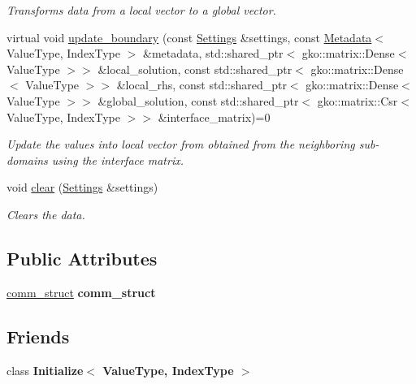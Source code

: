 \begin{DoxyCompactItemize}
\begin{DoxyCompactList}\small\item\em Transforms data from a local vector to a global vector. \end{DoxyCompactList}\item 
virtual void \hyperlink{classschwz_1_1Communicate_aa1332376dfc67f5384527be90df7cbea}{update\+\_\+boundary} (const \hyperlink{structschwz_1_1Settings}{Settings} \&settings, const \hyperlink{structschwz_1_1Metadata}{Metadata}$<$ Value\+Type, Index\+Type $>$ \&metadata, std\+::shared\+\_\+ptr$<$ gko\+::matrix\+::\+Dense$<$ Value\+Type $>$$>$ \&local\+\_\+solution, const std\+::shared\+\_\+ptr$<$ gko\+::matrix\+::\+Dense$<$ Value\+Type $>$$>$ \&local\+\_\+rhs, const std\+::shared\+\_\+ptr$<$ gko\+::matrix\+::\+Dense$<$ Value\+Type $>$$>$ \&global\+\_\+solution, const std\+::shared\+\_\+ptr$<$ gko\+::matrix\+::\+Csr$<$ Value\+Type, Index\+Type $>$$>$ \&interface\+\_\+matrix)=0
\begin{DoxyCompactList}\small\item\em Update the values into local vector from obtained from the neighboring sub-\/domains using the interface matrix. \end{DoxyCompactList}\item 
\mbox{\label{classschwz_1_1Communicate_a50833af98dd50e2c05029f16ab97479f}} 
void \hyperlink{classschwz_1_1Communicate_a50833af98dd50e2c05029f16ab97479f}{clear} (\hyperlink{structschwz_1_1Settings}{Settings} \&settings)
\begin{DoxyCompactList}\small\item\em Clears the data. \end{DoxyCompactList}\end{DoxyCompactItemize}
\subsection*{Public Attributes}
\begin{DoxyCompactItemize}
\item 
\mbox{\label{classschwz_1_1Communicate_a67f6d576d2bd14434247f8a9a9c99927}} 
\hyperlink{structschwz_1_1Communicate_1_1comm__struct}{comm\+\_\+struct} {\bfseries comm\+\_\+struct}
\end{DoxyCompactItemize}
\subsection*{Friends}
\begin{DoxyCompactItemize}
\item 
\mbox{\label{classschwz_1_1Communicate_a7044b349fe5363eeace2d1a56b38f650}} 
class {\bfseries Initialize$<$ Value\+Type, Index\+Type $>$}
\end{DoxyCompactItemize}


